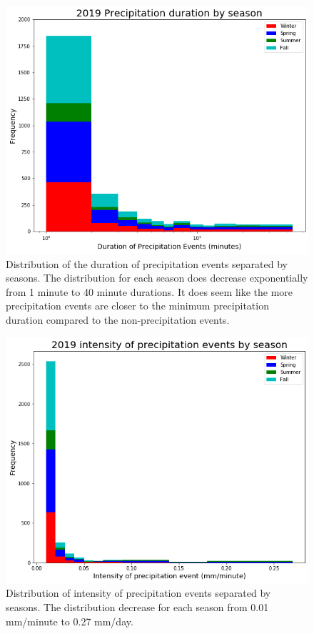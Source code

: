 \begin{figure}[h]
\centering
\includegraphics[width=150mm]{../Figures/precip1mm_season_19.png}
\caption{\label{abcj}Distribution of the duration of precipitation events
separated by seasons. The distribution for each season does decrease
exponentially from 1 minute to 40 minute durations. It does seem like
the more precipitation events are closer to the minimum precipitation
duration compared to the non-precipitation events.} 
\end{figure}
\begin{figure}[h]
\centering \includegraphics[width=150mm]{../Figures/inten1mm_season_19.png} 
\caption{\label{abck}Distribution of intensity of precipitation events
separated by seasons. The distribution decrease for each season from
0.01 mm/minute to 0.27 mm/day.}
\end{figure}
